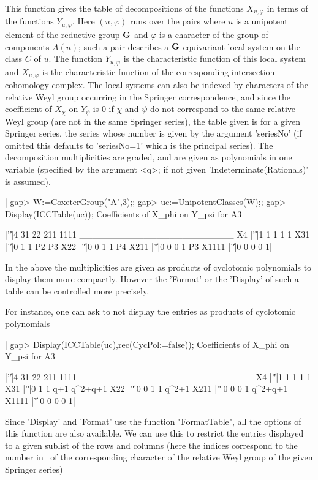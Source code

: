 This   function  gives  the  table   of  decompositions  of  the  functions
$X_{u,\varphi}$   in   terms   of   the   functions  $Y_{u,\varphi}$.  Here
$(u,\varphi)$  runs over the pairs where $u$  is a unipotent element of the
reductive  group  ${\bf G}$  and  $\varphi$  is  a  character  of  the group of
components  $A(u)$; such a pair  describes a ${\bf G}$-equivariant local system
on the class $C$ of $u$. The function $Y_{u,\varphi}$ is the characteristic
function  of this  local system  and $X_{u,\varphi}$  is the characteristic
function  of the  corresponding intersection  cohomology complex. The local
systems  can  also  be  indexed  by  characters  of the relative Weyl group
occurring  in  the  Springer  correspondence,  and since the coefficient of
$X_\chi$  on $Y_\psi$ is $0$ if $\chi$  and $\psi$ do not correspond to the
same  relative Weyl group (are not in  the same Springer series), the table
given  is for a given Springer series,  the series whose number is given by
the  argument 'seriesNo' (if omitted this defaults to 'seriesNo=1' which is
the principal series). The decomposition multiplicities are graded, and are
given as polynomials in one variable (specified by the argument <q>; if not
given 'Indeterminate(Rationals)' is assumed).

|    gap> W:=CoxeterGroup("A",3);;
    gap> uc:=UnipotentClasses(W);;
    gap> Display(ICCTable(uc));
    Coefficients of X_phi on Y_psi for A3

          |'\|'|4 31 22 211 1111
    ________________________
    X4    |'\|'|1  1  1   1    1
    X31   |'\|'|0  1  1  P2   P3
    X22   |'\|'|0  0  1   1   P4
    X211  |'\|'|0  0  0   1   P3
    X1111 |'\|'|0  0  0   0    1|

In  the  above  the  multiplicities  are  given  as  products of cyclotomic
polynomials  to display  them more  compactly. However  the 'Format' or the
'Display'   of  such  a  table  can   be  controlled  more  precisely.

For  instance,  one  can  ask  to  not  display  the entries as products of
cyclotomic polynomials\:

|    gap> Display(ICCTable(uc),rec(CycPol:=false));
    Coefficients of X_phi on Y_psi for A3

          |'\|'|4 31 22 211    1111
    ___________________________
    X4    |'\|'|1  1  1   1       1
    X31   |'\|'|0  1  1 q+1 q^2+q+1
    X22   |'\|'|0  0  1   1   q^2+1
    X211  |'\|'|0  0  0   1 q^2+q+1
    X1111 |'\|'|0  0  0   0       1|

Since  'Display'  and  'Format'  use  the  function  "FormatTable", all the
options  of this function are  also available. We can  use this to restrict
the  entries displayed to a given sublist of the rows and columns (here the
indices correspond to the number in \CHEVIE\ of the corresponding character
of the relative Weyl group of the given Springer series)\:

